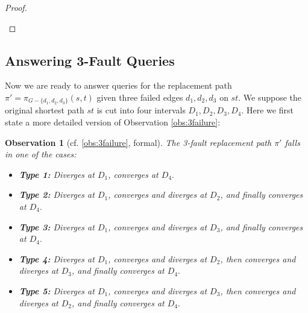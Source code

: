\documentclass[11pt]{article}
\theoremstyle{plain}
\newtheorem{observation}[theorem]{Observation}
\theoremstyle{definition}
\newcommand{\abs}[1]{\vert{#1}\vert}
\begin{document}
\begin{proof}
\begin{center}
 \end{center}

\end{proof}

\fi

\subsection{Answering 3-Fault Queries}
Now we are ready to answer queries for the replacement path $\pi'=\pi_{G-\{d_1,d_2,d_3\}}(s,t)$ given three failed edges $d_1,d_2,d_3$ on $st$. We suppose the original shortest path $st$ is cut into four intervals $D_1,D_2,D_3,D_4$. Here we first state a more detailed version of Observation \ref{obs:3failure}:

\begin{observation}[cf. \ref{obs:3failure}, formal]
The 3-fault replacement path $\pi'$ falls in one of the cases:
\begin{itemize}
    \item[-] \textbf{Type 1:} Diverges at $D_1$, converges at $D_4.$
    \item[-] \textbf{Type 2:} Diverges at $D_1$, converges and diverges at $D_2$, and finally converges at $D_4.$
    \item[-] \textbf{Type 3:} Diverges at $D_1$, converges and diverges at $D_3$, and finally converges at $D_4.$
    \item[-] \textbf{Type 4:} Diverges at $D_1$, converges and diverges at $D_2$, then converges and diverges at $D_3$, and finally converges at $D_4.$
    \item[-] \textbf{Type 5:} Diverges at $D_1$, converges and diverges at $D_3$, then converges and diverges at $D_2$, and finally converges at $D_4.$
\end{itemize}    
\end{observation}
\end{document}

